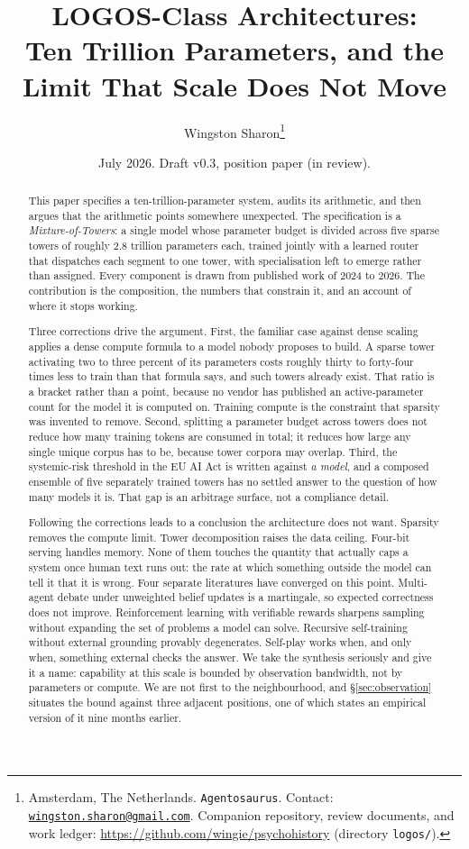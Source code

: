 \documentclass[11pt]{article}
\title{LOGOS-Class Architectures:\\
Ten Trillion Parameters, and the Limit That Scale Does Not Move}
\author{Wingston Sharon\thanks{Amsterdam, The Netherlands. \texttt{Agentosaurus}. Contact: \href{mailto:wingston.sharon@gmail.com}{\texttt{wingston.sharon@gmail.com}}. Companion repository, review documents, and work ledger: \url{https://github.com/wingie/psychohistory} (directory \texttt{logos/}).}}
\date{July 2026. Draft v0.3, position paper (in review).}
\begin{document}
\maketitle

\begin{abstract}
This paper specifies a ten-trillion-parameter system, audits its arithmetic, and then argues that the arithmetic points somewhere unexpected. The specification is a \emph{Mixture-of-Towers}: a single model whose parameter budget is divided across five sparse towers of roughly 2.8 trillion parameters each, trained jointly with a learned router that dispatches each segment to one tower, with specialisation left to emerge rather than assigned. Every component is drawn from published work of 2024 to 2026. The contribution is the composition, the numbers that constrain it, and an account of where it stops working.

Three corrections drive the argument. First, the familiar case against dense scaling applies a dense compute formula to a model nobody proposes to build. A sparse tower activating two to three percent of its parameters costs roughly thirty to forty-four times less to train than that formula says, and such towers already exist. That ratio is a bracket rather than a point, because no vendor has published an active-parameter count for the model it is computed on. Training compute is the constraint that sparsity was invented to remove. Second, splitting a parameter budget across towers does not reduce how many training tokens are consumed in total; it reduces how large any single unique corpus has to be, because tower corpora may overlap. Third, the systemic-risk threshold in the EU AI Act is written against \emph{a model}, and a composed ensemble of five separately trained towers has no settled answer to the question of how many models it is. That gap is an arbitrage surface, not a compliance detail.

Following the corrections leads to a conclusion the architecture does not want. Sparsity removes the compute limit. Tower decomposition raises the data ceiling. Four-bit serving handles memory. None of them touches the quantity that actually caps a system once human text runs out: the rate at which something outside the model can tell it that it is wrong. Four separate literatures have converged on this point. Multi-agent debate under unweighted belief updates is a martingale, so expected correctness does not improve. Reinforcement learning with verifiable rewards sharpens sampling without expanding the set of problems a model can solve. Recursive self-training without external grounding provably degenerates. Self-play works when, and only when, something external checks the answer. We take the synthesis seriously and give it a name: capability at this scale is bounded by observation bandwidth, not by parameters or compute. We are not first to the neighbourhood, and \S\ref{sec:observation} situates the bound against three adjacent positions, one of which states an empirical version of it nine months earlier.


\end{abstract}
\end{document}
